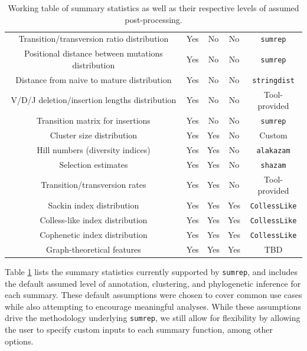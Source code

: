 \documentclass{article}
\begin{document}
\begin{table}
{\begin{tabular}{c|c|c|c|c}
Transition/transversion ratio distribution & Yes & No & No & \texttt{sumrep} \\
Positional distance between mutations distribution & Yes & No & No & \texttt{sumrep}  \\
Distance from naive to mature distribution & Yes & No & No & \texttt{stringdist} \\
V/D/J deletion/insertion lengths distribution & Yes & No & No & Tool-provided \\
Transition matrix for insertions & Yes & No & No & \texttt{sumrep} \\
\hline
Cluster size distribution & Yes & Yes & No & Custom \\
Hill numbers (diversity indices) & Yes & Yes & No & \texttt{alakazam} \\
Selection estimates & Yes & Yes & No & \texttt{shazam} \\
Transition/transversion rates & Yes & Yes & No & Tool-provided \\
\hline
    Sackin index distribution & Yes & Yes & Yes & \texttt{CollessLike} \cite{Mir2018-lk} \\
Colless-like index distribution & Yes & Yes & Yes & \texttt{CollessLike} \\
Cophenetic index distribution & Yes & Yes & Yes & \texttt{CollessLike} \\
Graph-theoretical features & Yes & Yes & Yes & TBD \\
\end{tabular}
}
\caption{Working table of summary statistics as well as their respective levels of assumed post-processing.}
\label{tab:SummaryStatistics}
\end{table}

Table \ref{tab:SummaryStatistics} lists the summary statistics currently supported by \texttt{sumrep}, and includes the default assumed level of annotation, clustering, and phylogenetic inference for each summary.
These default assumptions were chosen to cover common use cases while also attempting to encourage meaningful analyses.
While these assumptions drive the methodology underlying \texttt{sumrep}, we still allow for flexibility by allowing the user to specify custom inputs to each summary function, among other options.
\end{document}
